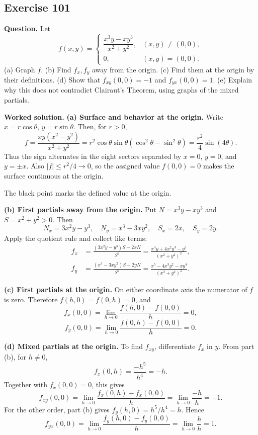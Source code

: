 \documentclass[11pt]{article}
\newcommand{\ex}[1]{\Needspace{8\baselineskip}\subsection*{Exercise #1}}
\newcommand{\ans}[1]{\boxed{#1}}
\begin{document}
\ex{101}
\textbf{Question.} Let
\[f(x,y)=\begin{cases}
\dfrac{x^3y-xy^3}{x^2+y^2},&(x,y)\ne(0,0),\\[0.4em]
0,&(x,y)=(0,0).
\end{cases}\]
(a) Graph $f$. (b) Find $f_x,f_y$ away from the origin. (c) Find them at the origin by their definitions. (d) Show that $f_{xy}(0,0)=-1$ and $f_{yx}(0,0)=1$. (e) Explain why this does not contradict Clairaut's Theorem, using graphs of the mixed partials.

\textbf{Worked solution.}
\textbf{(a) Surface and behavior at the origin.} Write $x=r\cos\theta$, $y=r\sin\theta$. Then, for $r>0$,
\[f=\frac{xy(x^2-y^2)}{x^2+y^2}
=r^2\cos\theta\sin\theta(\cos^2\theta-\sin^2\theta)
=\frac{r^2}{4}\sin(4\theta).\]
Thus the sign alternates in the eight sectors separated by $x=0$, $y=0$, and $y=\pm x$. Also $|f|\le r^2/4\to0$, so the assigned value $f(0,0)=0$ makes the surface continuous at the origin.
\begin{center}\end{center}
The black point marks the defined value at the origin.

\textbf{(b) First partials away from the origin.} Put $N=x^3y-xy^3$ and $S=x^2+y^2>0$. Then
\[N_x=3x^2y-y^3,\quad N_y=x^3-3xy^2,\quad S_x=2x,\quad S_y=2y.\]
Apply the quotient rule and collect like terms:
\begin{align*}
f_x&=\frac{(3x^2y-y^3)S-2xN}{S^2}
=\ans{\frac{x^4y+4x^2y^3-y^5}{(x^2+y^2)^2}},\\
f_y&=\frac{(x^3-3xy^2)S-2yN}{S^2}
=\ans{\frac{x^5-4x^3y^2-xy^4}{(x^2+y^2)^2}}.
\end{align*}

\textbf{(c) First partials at the origin.} On either coordinate axis the numerator of $f$ is zero. Therefore $f(h,0)=f(0,h)=0$, and
\[f_x(0,0)=\lim_{h\to0}\frac{f(h,0)-f(0,0)}h=\ans{0},\]
\[f_y(0,0)=\lim_{h\to0}\frac{f(0,h)-f(0,0)}h=\ans{0}.\]

\textbf{(d) Mixed partials at the origin.} To find $f_{xy}$, differentiate $f_x$ in $y$. From part (b), for $h\ne0$,
\[f_x(0,h)=\frac{-h^5}{h^4}=-h.\]
Together with $f_x(0,0)=0$, this gives
\[f_{xy}(0,0)=\lim_{h\to0}\frac{f_x(0,h)-f_x(0,0)}h
=\lim_{h\to0}\frac{-h}{h}=\ans{-1}.\]
For the other order, part (b) gives $f_y(h,0)=h^5/h^4=h$. Hence
\[f_{yx}(0,0)=\lim_{h\to0}\frac{f_y(h,0)-f_y(0,0)}h
=\lim_{h\to0}\frac{h}{h}=\ans{1}.\]
\end{document}

